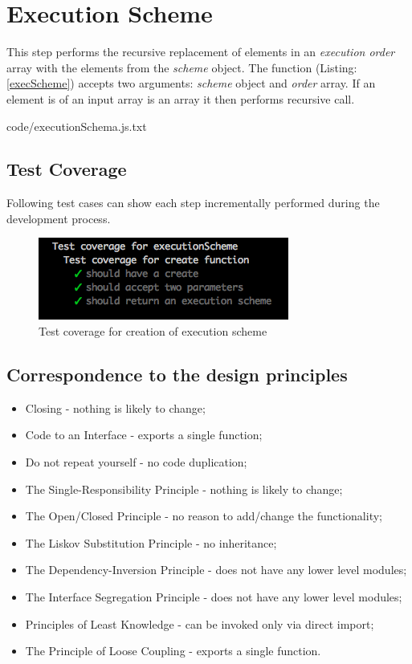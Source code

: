 \section{Execution Scheme}
\label{sec:execScheme}
This step performs the recursive replacement of elements in an \textit{execution order} array with the elements from the \textit{scheme} object. The function (Listing: \ref{execScheme}) accepts two arguments: \textit{scheme} object and \textit{order} array. If an element is of an input array is an array it then performs recursive call.


{code/executionSchema.js.txt}
\subsection{Test Coverage}
Following test cases can show each step incrementally performed during the development process.
\begin{figure}[H]
	\centering
	\includegraphics[width=\linewidth]{grafiken/testCreate.png}
	\caption{Test coverage for creation of execution scheme}
	\label{fig:testCreate}
\end{figure}

\subsection{Correspondence to the design principles}
\begin{itemize}
	\item Closing - nothing is likely to change;
	\item Code to an Interface - exports a single function;
	\item Do not repeat yourself - no code duplication;
	\item The Single-Responsibility Principle - nothing is likely to change;
	\item The Open/Closed Principle - no reason to add/change the functionality;
	\item The Liskov Substitution Principle - no inheritance;
	\item The Dependency-Inversion Principle - does not have any lower level modules;
	\item The Interface Segregation Principle - does not have any lower level modules;
	\item Principles of Least Knowledge -  can be invoked only via direct import;
	\item The Principle of Loose Coupling - exports a single function.
\end{itemize}

